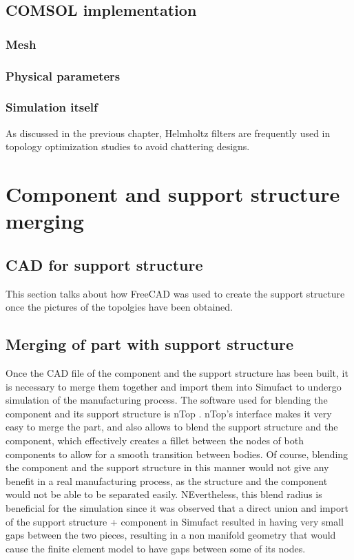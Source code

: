 \documentclass[../main.tex]{subfiles}
\begin{document}
\subsection{COMSOL implementation}

\subsubsection{Mesh}

\subsubsection{Physical parameters}

\subsubsection{Simulation itself}


As discussed in the previous chapter, Helmholtz filters are frequently used in topology optimization studies to avoid chattering designs. 


\section{Component and support structure merging}

\subsection{CAD for support structure}

This section talks about how FreeCAD was used to create the support structure once the pictures of the topolgies have been obtained.

\subsection{Merging of part with support structure}

Once the CAD file of the component and the support structure has been built, it is necessary to merge them together and import them into Simufact to undergo simulation of the manufacturing process. The software used for blending the component and its support structure is nTop . nTop's interface makes it very easy to merge the part, and also allows to blend the support structure and the component, which effectively creates a fillet between the nodes of both components to allow for a smooth transition between bodies. Of course, blending the component and the support structure in this manner would not give any benefit in a real manufacturing process, as the structure and the component would not be able to be separated easily. NEvertheless, this blend radius is beneficial for the simulation since it was observed that a direct union and import of the support structure + component in Simufact resulted in having very small gaps between the two pieces, resulting in a non manifold geometry that would cause the finite element model to have gaps between some of its nodes. 
\end{document}
